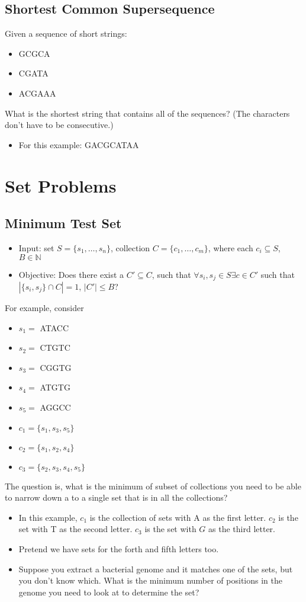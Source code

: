 \documentclass[10pt]{article}
\begin{document}
\subsection*{Shortest Common Supersequence}
Given a sequence of short strings:
\begin{itemize}
	\item GCGCA
	\item CGATA
	\item ACGAAA
\end{itemize}
What is the shortest string that contains all of the sequences?  (The characters don't have to be consecutive.)
\begin{itemize}
	\item For this example: GACGCATAA
\end{itemize}

\section*{Set Problems}
\subsection*{Minimum Test Set}
\begin{itemize}
	\item Input: set $S = \{s_1, \dots, s_n\}$, collection $C = \{c_1, \dots, c_m\}$, where each $c_i \subseteq S$, $B \in \mathbb{N}$
	\item Objective: Does there exist a $C' \subseteq C$, such that $\forall s_i, s_j \in S \exists c \in C'$ such that $|\{s_i, s_j\} \cap C| = 1$, $|C'| \leq B$?
\end{itemize}
For example, consider
\begin{itemize}
    \item $s_1 = $ ATACC
    \item $s_2 = $ CTGTC
    \item $s_3 = $ CGGTG
    \item $s_4 = $ ATGTG
    \item $s_5 = $ AGGCC
    \item $c_1 = \{s_1, s_3, s_5\}$
    \item $c_2 = \{s_1, s_2, s_4\}$
    \item $c_3 = \{s_2, s_3, s_4, s_5\}$
\end{itemize}
The question is, what is the minimum of subset of collections you need to be able to narrow down a to a single set that is in all the collections?
\begin{itemize}
	\item In this example, $c_1$ is the collection of sets with A as the first letter.  $c_2$ is the set with T as the second letter.  $c_3$ is the set with $G$ as the third letter.
	\item Pretend we have sets for the forth and fifth letters too.
	\item Suppose you extract a bacterial genome and it matches one of the sets, but you don't know which.  What is the minimum number of positions in the genome you need to look at to determine the set?
\end{itemize}
\end{document}
